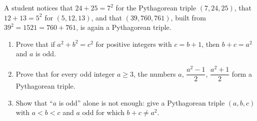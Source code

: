A student notices that $24+25=7^2$ for the Pythagorean triple $(7,24,25)$, that $12+13=5^2$ for $(5,12,13)$, and that $(39,760,761)$, built from $39^2=1521=760+761$, is again a Pythagorean triple.
\begin{enumerate}
\item[(a)] Prove that if $a^2+b^2=c^2$ for positive integers with $c=b+1$, then $b+c=a^2$ and $a$ is odd.
\item[(b)] Prove that for every odd integer $a\ge3$, the numbers $a$, $\dfrac{a^2-1}{2}$, $\dfrac{a^2+1}{2}$ form a Pythagorean triple.
\item[(c)] Show that ``$a$ is odd'' alone is not enough: give a Pythagorean triple $(a,b,c)$ with $a<b<c$ and $a$ odd for which $b+c\ne a^2$.
\end{enumerate}
